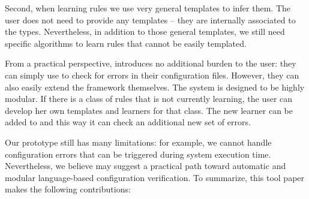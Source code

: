 Second, when learning rules we use very general templates to 
infer them. The user does not need to provide any templates -- they are internally associated to the types.
Nevertheless, in addition to those general templates, we still need specific algorithms to learn
rules that cannot be easily templated. 


From a practical perspective, 
\app introduces no additional burden 
to the user: they can simply use \app to check for errors in their
configuration files. However, they can also easily extend the framework
themselves. The system is designed to be highly modular. If there is a
class of rules that \app is not currently learning, the user can develop
her own templates and learners for that class. The new learner can be
added to \app and this way it can check an additional new set of
errors.

Our \app prototype still has many limitations:
for example, we cannot handle configuration errors that can be 
triggered during system execution time.
Nevertheless, we believe \app may suggest a practical path
toward automatic and modular language-based configuration verification.
To summarize, this tool paper makes the following contributions:



